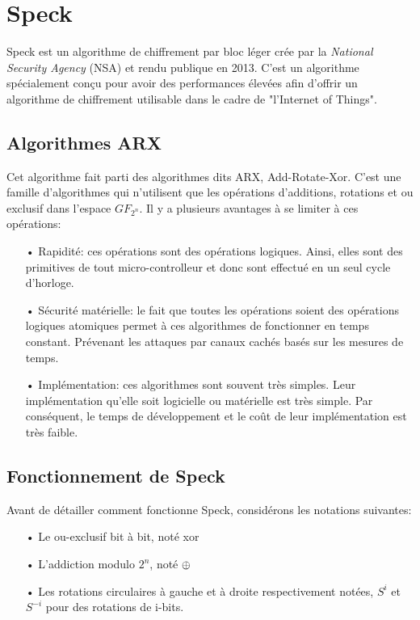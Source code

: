 		\section{Speck}

			Speck est un algorithme de chiffrement par bloc léger crée par la
		\textit{National Security Agency} (NSA) et rendu
		publique en 2013. C'est un algorithme spécialement conçu pour avoir des performances
		élevées afin d'offrir un algorithme de chiffrement utilisable dans le cadre de
		"l'Internet of Things".

		\subsection{Algorithmes ARX}

				Cet algorithme fait parti des algorithmes dits ARX, Add-Rotate-Xor. C'est une famille
			d'algorithmes qui n'utilisent que les opérations d'additions, rotations et ou exclusif
			dans l'espace $GF_{2^n}$. Il y a plusieurs avantages à se limiter à ces opérations:

			\begin{enumerate}
			\item[•] Rapidité: ces opérations sont des opérations logiques. Ainsi, elles sont
				des primitives de tout micro-controlleur et donc sont effectué en un seul
				cycle d'horloge.
			\item[•] Sécurité matérielle: le fait que toutes les opérations soient des opérations
				logiques atomiques permet à ces algorithmes de fonctionner en temps constant.
				Prévenant les attaques par canaux cachés basés sur les mesures de temps.
			\item[•] Implémentation: ces algorithmes sont souvent très simples. Leur implémentation
				qu'elle soit logicielle ou matérielle est très simple. Par conséquent, le
				temps de développement et le coût de leur implémentation est très faible.
			\end{enumerate}

		\subsection{Fonctionnement de Speck}

			Avant de détailler comment fonctionne Speck, considérons les notations suivantes:

			\begin{enumerate}
			  \item[•] Le ou-exclusif bit à bit, noté xor
			  \item[•] L'addiction modulo $2^n$, noté $\mathbin{\oplus}$
			  \item[•] Les rotations circulaires à gauche et à droite respectivement notées,
			    $S^i$ et $S^{-i}$ pour des rotations de i-bits.
			\end{enumerate}

